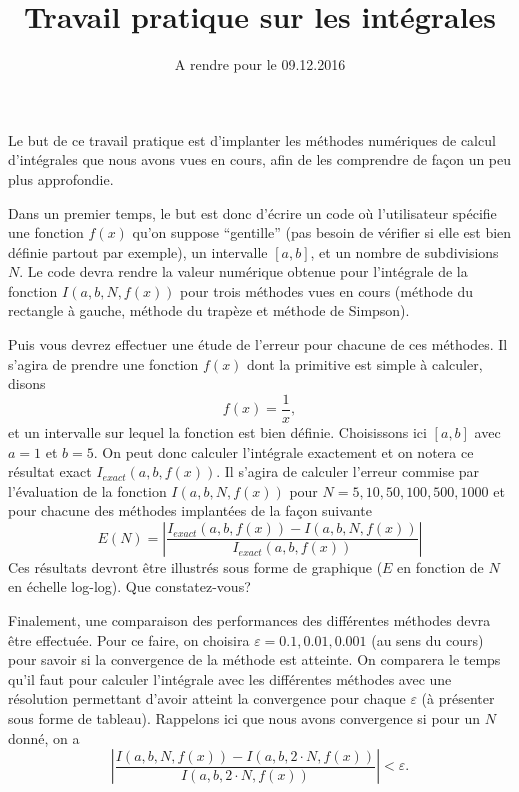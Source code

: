 \documentclass[a4paper,10pt]{article}
\title{Travail pratique sur les intégrales}
\date{A rendre pour le 09.12.2016}
\begin{document}
\maketitle

Le but de ce travail pratique est d'implanter les méthodes numériques de calcul d'intégrales que nous avons vues en cours,
afin de les comprendre de façon un peu plus approfondie.

Dans un premier temps, le but est donc d'écrire un code où l'utilisateur spécifie une fonction $f(x)$ qu'on 
suppose ``gentille'' (pas besoin de vérifier 
si elle est bien définie partout par exemple), un intervalle $[a,b]$, et 
un nombre de subdivisions $N$. Le code devra rendre la valeur numérique obtenue pour l'intégrale de la fonction $I(a,b,N,f(x))$ 
pour trois méthodes 
vues en cours (méthode du rectangle à gauche, méthode du trapèze et méthode de Simpson).

Puis vous devrez effectuer une étude de l'erreur pour chacune de ces méthodes. Il s'agira de prendre une fonction $f(x)$ 
dont la primitive est simple à calculer, disons
\begin{equation}
f(x)=\frac{1}{x},
\end{equation}
et un intervalle sur lequel la fonction est bien définie. Choisissons ici $[a,b]$ avec $a=1$ et $b=5$. 
On peut donc calculer l'intégrale exactement et on notera ce résultat exact $I_{exact}(a,b,f(x))$.
Il s'agira de calculer l'erreur commise par l'évaluation de la fonction $I(a,b,N,f(x))$ 
pour $N=5, 10, 50, 100, 500, 1000$  et pour chacune des méthodes implantées de la façon suivante
\begin{equation}
 E(N)=\left|\frac{I_{exact}(a,b,f(x))-I(a,b,N,f(x))}{I_{exact}(a,b,f(x))}\right|
\end{equation}
Ces résultats devront être illustrés sous forme de graphique ($E$ en fonction de $N$ en échelle log-log).
Que constatez-vous?

Finalement, une comparaison des performances des différentes méthodes devra être effectuée.
Pour ce faire, on choisira $\varepsilon=0.1,0.01,0.001$ (au sens du cours) pour savoir si la convergence de la méthode est atteinte.
On comparera le temps qu'il faut pour calculer l'intégrale avec les différentes méthodes
avec une résolution permettant d'avoir atteint la convergence pour chaque $\varepsilon$
(à présenter sous forme de tableau). 
Rappelons ici que nous avons convergence si pour un $N$ donné, on a
\begin{equation}
 \left|\frac{I(a,b,N,f(x))-I(a,b,2\cdot N,f(x))}{I(a,b,2\cdot N,f(x))}\right|<\varepsilon.
\end{equation}
\end{document}
